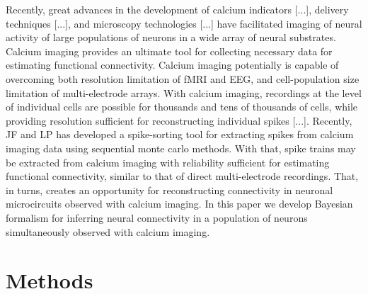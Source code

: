 \documentclass[amsmath,amssymb]{revtex4}
\begin{document}
Recently, great advances in the development of calcium indicators [...], delivery techniques [...], and microscopy technologies [...] have facilitated imaging of neural activity of large populations of neurons in a wide array of neural substrates. Calcium imaging provides an ultimate tool for collecting necessary data for estimating functional connectivity. Calcium imaging potentially is capable of overcoming both resolution limitation of fMRI and EEG, and cell-population size limitation of multi-electrode arrays. With calcium imaging, recordings at the level of individual cells are possible for thousands and tens of thousands of cells, while providing resolution sufficient for reconstructing individual spikes [...]. Recently, JF and LP has developed a spike-sorting tool for extracting spikes from calcium imaging data using sequential monte carlo methods. With that, spike trains may be extracted from calcium imaging with reliability sufficient for estimating functional connectivity, similar to that of direct multi-electrode recordings. That, in turns, creates an opportunity for reconstructing connectivity in neuronal microcircuits observed with calcium imaging. In this paper we develop Bayesian formalism for inferring neural connectivity in a population of neurons simultaneously observed with calcium imaging.

\section{\label{sec:methods}Methods}
\end{document}
